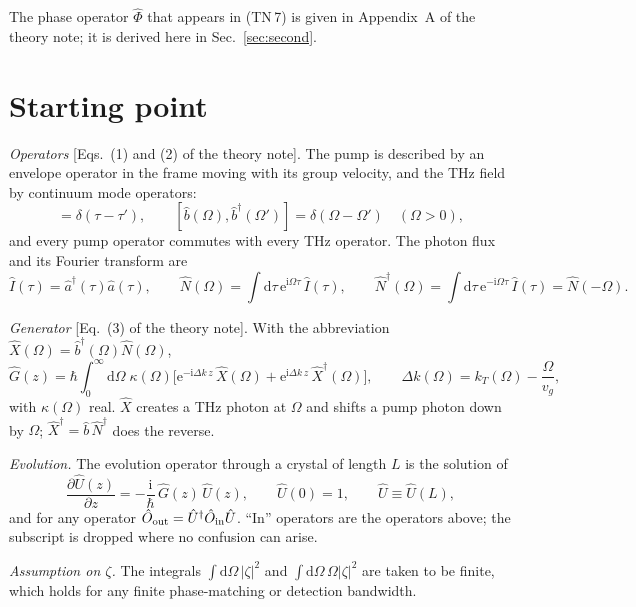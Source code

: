 \documentclass[aps,pra,onecolumn,notitlepage,11pt,amsmath,amssymb,nofootinbib]{revtex4-2}
\newcommand{\Nop}{\hat N}
\newcommand{\Iop}{\hat I}
\newcommand{\Xop}{\hat X}
\newcommand{\dd}{\mathrm{d}}
\newcommand{\ee}{\mathrm{e}}
\newcommand{\ii}{\mathrm{i}}
\begin{document}
The phase operator $\hat\Phi$ that appears in (TN\,7) is given in Appendix~A
of the theory note; it is derived here in Sec.~\ref{sec:second}.

\section{Starting point}
\label{sec:start}

\emph{Operators} [Eqs.~(1) and (2) of the theory note]. The pump is described
by an envelope operator in the frame moving with its group velocity, and the
THz field by continuum mode operators:
\begin{equation}
[\hat a(\tau),\hat a^\dagger(\tau')]=\delta(\tau-\tau'),\qquad
[\hat b(\Omega),\hat b^\dagger(\Omega')]=\delta(\Omega-\Omega')\quad(\Omega>0),
\end{equation}
and every pump operator commutes with every THz operator. The photon flux and
its Fourier transform are
\begin{equation}
\Iop(\tau)=\hat a^\dagger(\tau)\hat a(\tau),\qquad
\Nop(\Omega)=\int\!\dd\tau\,\ee^{\ii\Omega\tau}\,\Iop(\tau),\qquad
\Nop^\dagger(\Omega)=\int\!\dd\tau\,\ee^{-\ii\Omega\tau}\,\Iop(\tau)=\Nop(-\Omega).
\label{eq:Ndef}
\end{equation}

\emph{Generator} [Eq.~(3) of the theory note]. With the abbreviation
$\Xop(\Omega)=\hat b^\dagger(\Omega)\Nop(\Omega)$,
\begin{equation}
\hat G(z)=\hbar\int_0^\infty\!\!\dd\Omega\;\kappa(\Omega)
\Big[\ee^{-\ii\Delta k\,z}\,\Xop(\Omega)+\ee^{\ii\Delta k\,z}\,\Xop^\dagger(\Omega)\Big],
\qquad \Delta k(\Omega)=k_T(\Omega)-\frac{\Omega}{v_g},
\label{eq:G}
\end{equation}
with $\kappa(\Omega)$ real. $\Xop$ creates a THz photon at $\Omega$ and shifts a
pump photon down by $\Omega$; $\Xop^\dagger=\hat b\,\Nop^\dagger$ does the
reverse.

\emph{Evolution.} The evolution operator through a crystal of length $L$ is
the solution of
\begin{equation}
\frac{\partial\hat U(z)}{\partial z}=-\frac{\ii}{\hbar}\,\hat G(z)\,\hat U(z),
\qquad \hat U(0)=1,\qquad \hat U\equiv\hat U(L),
\label{eq:evol}
\end{equation}
and for any operator $\hat O_{\rm out}=\hat U^\dagger\hat O_{\rm in}\hat U$.
``In'' operators are the operators above; the subscript is dropped where no
confusion can arise.

\emph{Assumption on $\zeta$.} The integrals $\int\dd\Omega\,|\zeta|^2$ and
$\int\dd\Omega\,\Omega|\zeta|^2$ are taken to be finite, which holds for any
finite phase-matching or detection bandwidth.
\end{document}
